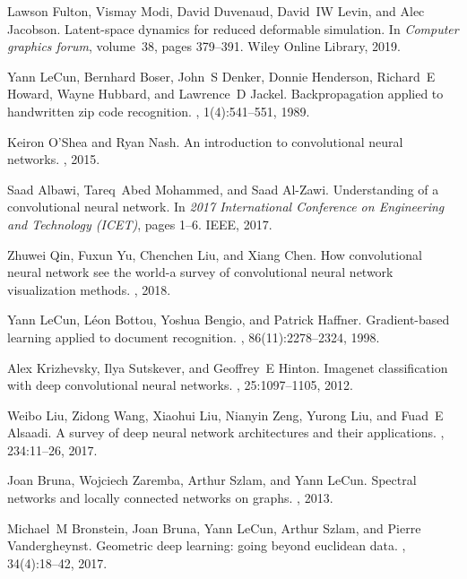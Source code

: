 \documentclass[12pt,reqno]{article}
\begin{document}
\begin{thebibliography}{10}
Lawson Fulton, Vismay Modi, David Duvenaud, David~IW Levin, and Alec Jacobson.
\newblock Latent-space dynamics for reduced deformable simulation.
\newblock In {\em Computer graphics forum}, volume~38, pages 379--391. Wiley
Online Library, 2019.

Yann LeCun, Bernhard Boser, John~S Denker, Donnie Henderson, Richard~E Howard,
Wayne Hubbard, and Lawrence~D Jackel.
\newblock Backpropagation applied to handwritten zip code recognition.
, 1(4):541--551, 1989.

Keiron O'Shea and Ryan Nash.
\newblock An introduction to convolutional neural networks.
, 2015.

Saad Albawi, Tareq~Abed Mohammed, and Saad Al-Zawi.
\newblock Understanding of a convolutional neural network.
\newblock In {\em 2017 International Conference on Engineering and Technology
(ICET)}, pages 1--6. {IEEE}, 2017.

Zhuwei Qin, Fuxun Yu, Chenchen Liu, and Xiang Chen.
\newblock How convolutional neural network see the world-a survey of
convolutional neural network visualization methods.
, 2018.

Yann LeCun, L{\'e}on Bottou, Yoshua Bengio, and Patrick Haffner.
\newblock Gradient-based learning applied to document recognition.
, 86(11):2278--2324, 1998.

Alex Krizhevsky, Ilya Sutskever, and Geoffrey~E Hinton.
\newblock Imagenet classification with deep convolutional neural networks.
,
25:1097--1105, 2012.

Weibo Liu, Zidong Wang, Xiaohui Liu, Nianyin Zeng, Yurong Liu, and Fuad~E
Alsaadi.
\newblock A survey of deep neural network architectures and their applications.
, 234:11--26, 2017.

Joan Bruna, Wojciech Zaremba, Arthur Szlam, and Yann LeCun.
\newblock Spectral networks and locally connected networks on graphs.
, 2013.

Michael~M Bronstein, Joan Bruna, Yann LeCun, Arthur Szlam, and Pierre
Vandergheynst.
\newblock Geometric deep learning: going beyond euclidean data.
, 34(4):18--42, 2017.


\end{thebibliography}
\end{document}
